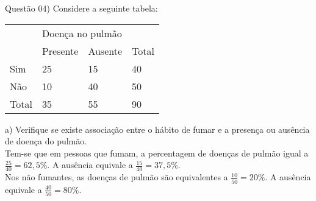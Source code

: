 
\noindent \textcolor{COLOR1}{Questão 04)} Considere a seguinte tabela:
\\

\begin{table}[ht]
    \centering
    \begin{tabular}{l|l|l|l}
        \hline
        \rowcolor{pagecolor!50!COLOR1}
        \multicolumn{1}{c|}{\cellcolor{pagecolor!50!COLOR1}}                                    & \multicolumn{2}{l|}{\cellcolor{pagecolor!50!COLOR1}Doença no pulmão} & \cellcolor{pagecolor!50!COLOR1}                                                          \\ \cline{2-3}
        \rowcolor{pagecolor!50!COLOR1}
        \multicolumn{1}{c|}{\multirow{-2}{*}{\cellcolor{pagecolor!50!COLOR1}{Hábito de fumar}}} & Presente                                                             & Ausente                         & \multirow{-2}{*}{\cellcolor{pagecolor!50!COLOR1}Total} \\ \hline \hline
        Sim                                                                                     & 25                                                                   & 15                              & 40                                                     \\ \hline
        Não                                                                                     & 10                                                                   & 40                              & 50                                                     \\ \hline
        Total                                                                                   & 35                                                                   & 55                              & 90                                                     \\ \hline
    \end{tabular}
\end{table}


a) Verifique se existe associação entre o hábito de fumar e a presença ou ausência de doença do pulmão.
\\

Tem-se que em pessoas que fumam, a percentagem de doenças de pulmão igual a $\frac{25}{40} = 62,5\%$. A ausência equivale a $\frac{15}{40} = 37,5\%$.
\\

Nos não fumantes, as doenças de pulmão são equivalentes a $\frac{10}{50} = 20 \%$. A ausência equivale a $\frac{40}{50} = 80\%$.
\\

